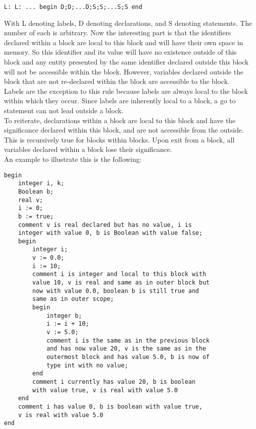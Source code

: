 \documentclass{article}
\begin{document}
\begin{lstlisting}[language={[60]algol}]
L: L: ... begin D;D;...D;S;S;...S;S end
\end{lstlisting}

With L denoting labels, D denoting declarations, and S denoting statements. The number of each is arbitrary. Now the interesting part is that the identifiers declared within a block are local to this block and will have their own space in memory. So this identifier and its value will have no existence outside of this block and any entity presented by the same identifier declared outside this block will not be accessible within the block. However, variables declared outside the block that are not re-declared within the block are accessible to the block. \\

Labels are the exception to this rule because labels are always local to the block within which they occur. Since labels are inherently local to a block, a go to statement can not lead outside a block.\\

To reiterate, declarations within a block are local to this block and have the significance declared within this block, and are not accessible from the outside. This is recursively true for blocks within blocks. Upon exit from a block, all variables declared within a block lose their significance.\\

An example to illustrate this is the following:

\begin{lstlisting}[language={[60]algol}]
begin
    integer i, k;
    Boolean b;
    real v;
    i := 0;
    b := true;
    comment v is real declared but has no value, i is 
    integer with value 0, b is Boolean with value false;
    begin
        integer i;
        v := 0.0;
        i := 10;
        comment i is integer and local to this block with 
        value 10, v is real and same as in outer block but 
        now with value 0.0, boolean b is still true and 
        same as in outer scope;
        begin
            integer b;
            i := i + 10;
            v := 5.0;
            comment i is the same as in the previous block 
            and has now value 20, v is the same as in the 
            outermost block and has value 5.0, b is now of 
            type int with no value;
        end
        comment i currently has value 20, b is boolean 
        with value true, v is real with value 5.0
    end
    comment i has value 0, b is boolean with value true, 
    v is real with value 5.0
end
\end{lstlisting}
\end{document}
